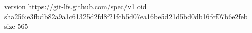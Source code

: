 version https://git-lfs.github.com/spec/v1
oid sha256:e3fbdb82a9a1c61325d2fd8f21fcb5d07ea16be5d21d5bd0db16fcf07b6e2feb
size 565

